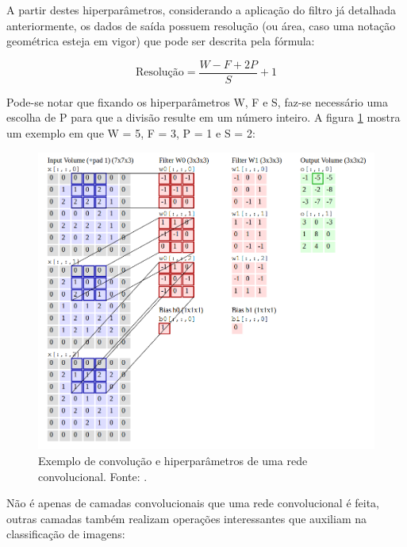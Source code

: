 \documentclass[
	12pt,				%
	oneside,			%
	a4paper,			%
	english,			%
	french,				%
	spanish,			%
	brazil,				%
	]{abntex2}
\begin{document}
A partir destes hiperparâmetros, considerando a aplicação do filtro já detalhada anteriormente, os dados de saída possuem resolução (ou área, caso uma notação geométrica esteja em vigor) que pode ser descrita pela fórmula:

\begin{equation}
	\textrm{Resolução} = \frac{W - F + 2P}{S} + 1 
	\label{resolução}
\end{equation}

Pode-se notar que fixando os hiperparâmetros W, F e S, faz-se necessário uma escolha de P para que a divisão resulte em um número inteiro. A figura \ref{exemplo_conv} mostra um exemplo em que W = 5, F = 3, P = 1 e S = 2:

\begin{figure}[H]
	\centering
	\includegraphics[width=.8\textwidth]{imagens/gif_conv}
	\caption{Exemplo de convolução e hiperparâmetros de uma rede convolucional. Fonte: \cite{ref3}.}
	\label{exemplo_conv}
\end{figure} 


Não é apenas de camadas convolucionais que uma rede convolucional é feita, outras camadas também realizam operações interessantes que auxiliam na classificação de imagens:
\end{document}
